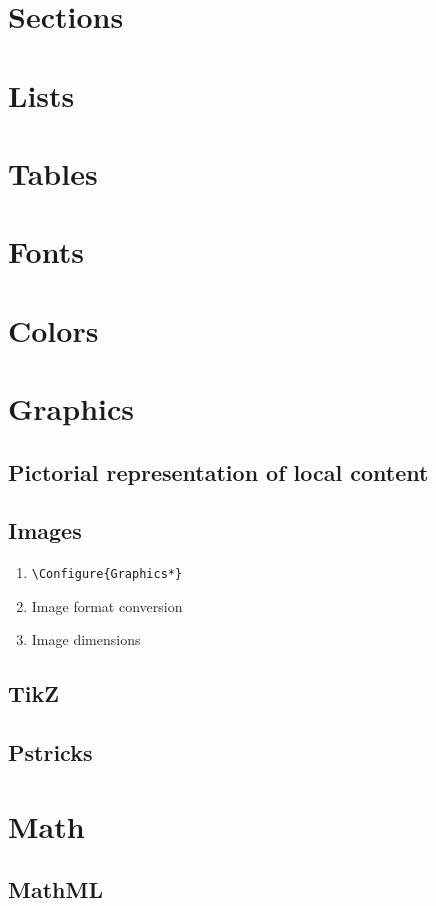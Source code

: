 \documentclass{book}
\begin{document}
\section{Sections}
\section{Lists}
\section{Tables}

\section{Fonts}
\section{Colors}

\section{Graphics}
\subsection{Pictorial representation of local content}
\subsection{Images}
\begin{enumerate}
  \item \verb|\Configure{Graphics*}|
  \item Image format conversion
  \item Image dimensions
\end{enumerate}
\subsection{TikZ }
\subsection{Pstricks}

\section{Math}
\subsection{MathML}
\end{document}

